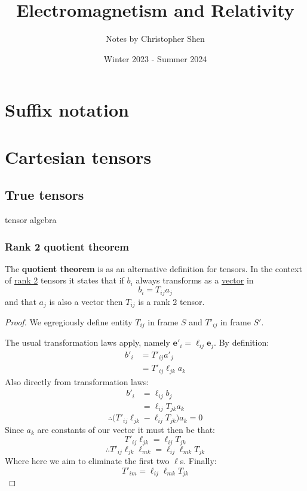 \documentclass{article}
\title{Electromagnetism and Relativity}
\author{Notes by Christopher Shen}
\date{Winter 2023 - Summer 2024}
\begin{document}
\maketitle
\newpage

\tableofcontents
\newpage

\pagestyle{fancy}
\fancyhead{}

\section{Suffix notation}

\section{Cartesian tensors}

\subsection{True tensors}
tensor algebra

\subsubsection{Rank 2 quotient theorem}
The \textbf{quotient theorem} is as an alternative definition for tensors. In the context of \underline{rank 2} tensors it states that if $b_i$ always transforms as a \underline{vector} in
$$b_i=T_{ij}a_j$$
and that $a_j$ is also a vector then $T_{ij}$ is a rank 2 tensor.
\begin{proof}
    We egregiously define entity $T_{ij}$ in frame $S$ and $T'_{ij}$ in frame $S'$.

    The usual transformation laws apply, namely $\boldsymbol{e}'_i=\ell_{ij}\boldsymbol{e}_j$. By definition:
    \begin{align*}
        b'_i
        &=T'_{ij}a'_j \\
        &=T'_{ij}\ell_{jk}a_k
    \end{align*}
    Also directly from transformation laws:
    \begin{align*}
        b'_i
        &=\ell_{ij}b_j \\
        &=\ell_{ij}T_{jk}a_k
    \end{align*}
    $$\therefore\bigl(T'_{ij}\ell_{jk}-\ell_{ij}T_{jk}\bigl)a_k=0$$
    Since $a_k$ are constants of our vector it must then be that:
    $$T'_{ij}\ell_{jk}=\ell_{ij}T_{jk}$$
    $$\therefore T'_{ij}\ell_{jk}\ell_{mk}=\ell_{ij}\ell_{mk}T_{jk}$$
    Where here we aim to eliminate the first two $\ell$s. Finally:
    $$T'_{im}=\ell_{ij}\ell_{mk}T_{jk}$$
\end{proof}
\end{document}
